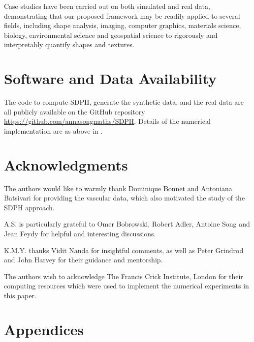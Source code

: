 \documentclass[11pt]{article}
\theoremstyle{plain}
\theoremstyle{definition}
\theoremstyle{remark}
\begin{document}
	Case studies have been carried out on both simulated and real data,
	demonstrating that our proposed framework may be readily applied to several fields, including shape analysis, imaging, computer graphics, materials science, biology, environmental science and geospatial science to rigorously and interpretably quantify shapes and textures.
	
	\section*{Software and Data Availability}
	
	The code to compute SDPH, generate the synthetic data, and the real data are all publicly available on the GitHub repository \url{https://github.com/annasongmaths/SDPH}. Details of the numerical implementation are as above in .
	
	\section*{Acknowledgments}
	
	The authors would like to warmly thank Dominique Bonnet and Antoniana Batsivari for providing the vascular data, which also motivated the study of the SDPH approach.
	
	A.S. is particularly grateful to Omer Bobrowski, Robert Adler, Antoine Song and Jean Feydy for helpful and interesting discussions.
	
	
	K.M.Y. thanks Vidit Nanda for insightful comments, as well as Peter Grindrod and John Harvey for their guidance and mentorship. 
	
	
	The authors wish to acknowledge The Francis Crick Institute, London
	for their computing resources which were used to implement the numerical experiments in this paper.
	
	{\footnotesize 
		
		
	}
	
	
	
	\appendix
	\section*{Appendices}
	\renewcommand{\thesubsection}{\Alph{subsection}}
	\label{sec:Appendix}
	
\end{document}
